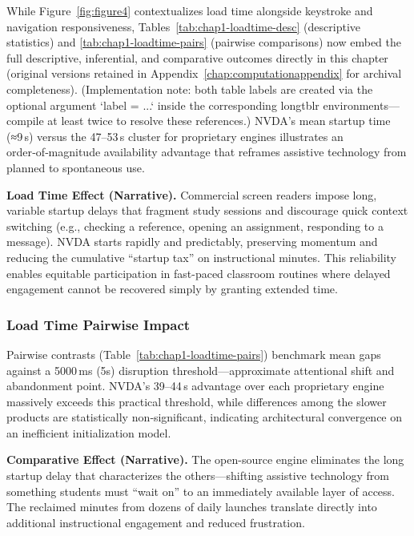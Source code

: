 While Figure~\ref{fig:figure4} contextualizes load time alongside keystroke and navigation responsiveness, Tables~\ref{tab:chap1-loadtime-desc} (descriptive statistics) and \ref{tab:chap1-loadtime-pairs} (pairwise comparisons) now embed the full descriptive, inferential, and comparative outcomes directly in this chapter (original versions retained in Appendix~\ref{chap:computationappendix} for archival completeness). (Implementation note: both table labels are created via the optional argument `label = {...}` inside the corresponding longtblr environments—compile at least twice to resolve these references.) NVDA’s mean startup time (≈9\,s) versus the 47–53\,s cluster for proprietary engines illustrates an order‑of‑magnitude availability advantage that reframes assistive technology from planned to spontaneous use.

\noindent\textbf{Load Time Effect (Narrative).} Commercial screen readers impose long, variable startup delays that fragment study sessions and discourage quick context switching (e.g., checking a reference, opening an assignment, responding to a message). NVDA starts rapidly and predictably, preserving momentum and reducing the cumulative “startup tax” on instructional minutes. This reliability enables equitable participation in fast-paced classroom routines where delayed engagement cannot be recovered simply by granting extended time.

\subsubsection{Load Time Pairwise Impact}

Pairwise contrasts (Table~\ref{tab:chap1-loadtime-pairs}) benchmark mean gaps against a 5000\,ms (5s) disruption threshold—approximate attentional shift and abandonment point. NVDA’s 39–44\,s advantage over each proprietary engine massively exceeds this practical threshold, while differences among the slower products are statistically non‑significant, indicating architectural convergence on an inefficient initialization model.

\noindent\textbf{Comparative Effect (Narrative).} The open-source engine eliminates the long startup delay that characterizes the others—shifting assistive technology from something students must “wait on” to an immediately available layer of access. The reclaimed minutes from dozens of daily launches translate directly into additional instructional engagement and reduced frustration.


